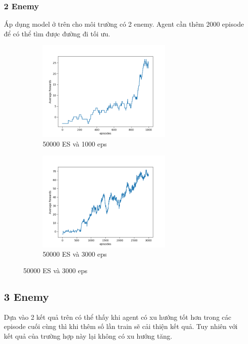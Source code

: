 \documentclass[12pt,a4paper]{article}
\begin{document}
\subsubsection{2 Enemy}
Áp dụng model ở trên cho môi trường có 2 enemy. Agent cần thêm 2000 episode để có thể tìm được đường đi tối ưu.\\
\begin{figure}[h]
    \centering
    \begin{subfigure}[b]{.32\textwidth}
    \includegraphics[width=0.9\linewidth, height=5cm]{pythonsection/result/result_2e_50000epsilon_1000eps.png}
    \caption{50000 ES và 1000 eps}
    \label{fig:2e1}
    \end{subfigure}
    \begin{subfigure}[b]{.32\textwidth}
    \includegraphics[width=0.9\linewidth, height=5cm]{pythonsection/result/result_2e_50000epsilon_3000eps.png}
    \caption{50000 ES và 3000 eps}
    \label{fig:2e2}
    \end{subfigure}
\end{figure}

\subsection{3 Enemy}
Dựa vào 2 kết quả trên có thể thấy khi agent có xu hướng tốt hơn trong các episode cuối cùng thì khi thêm số lần train sẽ cải thiện kết quả. Tuy nhiên với kết quả của trường hợp này lại không có xu hướng tăng. 
\end{document}
